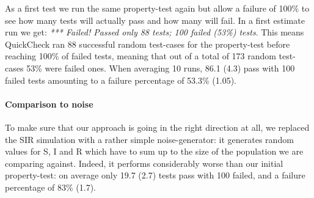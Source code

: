 As a first test we run the same property-test again but allow a failure of 100\% to see how many tests will actually pass and how many will fail. In a first estimate run we get: \textit{*** Failed! Passed only 88 tests; 100 failed (53\%) tests}. This means QuickCheck ran 88 successful random test-cases for the property-test before reaching 100\% of failed tests, meaning that out of a total of 173 random test-cases 53\% were failed ones. When averaging 10 runs, 86.1 (4.3) pass with 100 failed tests amounting to a failure percentage of 53.3\% (1.05).

\paragraph{Comparison to noise}
To make sure that our approach is going in the right direction at all, we replaced the SIR simulation with a rather simple noise-generator: it generates random values for S, I and R which have to sum up to the size of the population we are comparing against. Indeed, it performs considerably worse than our initial property-test: on average only 19.7 (2.7) tests pass with 100 failed, and a failure percentage of 83\% (1.7). 

%


%

